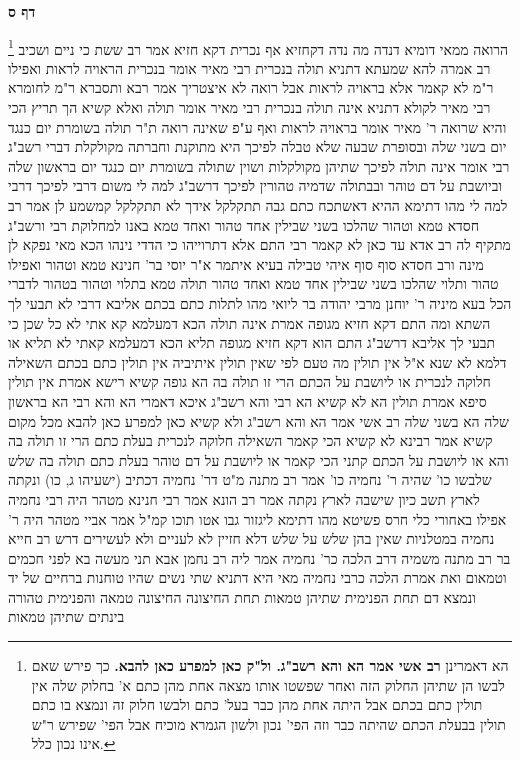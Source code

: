 \documentclass[12pt, openany]{book}
\newcommand{\sethebfont}{
\fontsize{10.5pt}{21.0pt} \selectfont
}
\newcommand{\twocol}[1]{
	{\sethebfont \begin{multicols}{2}
			#1
	\end{multicols}}	
}
\newcommand{\sectname}{}
\newcommand{\newsection}[1]{
	\addcontentsline{toc}{section}{#1}
	\renewcommand{\sectname}{#1}	
	\vspace{-\baselineskip}
	\begin{center}
		\textbf{%
\fontsize{16pt}{16pt}\selectfont
			#1}
	\end{center}
	\vspace{-\baselineskip}
	\nopagebreak
}
\newcommand{\footnotecomment}[1]{
	\renewcommand\thefootnote{}
	\footnote{#1}}
\newcommand{\commenta}[1]{\footnotecomment{#1}}
\begin{document}
\newsection{דף ס}
\twocol{
\commenta{ הא דאמרינן \textbf{רב אשי אמר הא והא רשב"ג. ול"ק כאן למפרע כאן להבא.} כך פירש שאם לבשו הן שתיהן החלוק הזה ואחר שפשטו אותו מצאה אחת מהן כתם א' בחלוק שלה אין תולין כתם בכתם אבל היתה אחת מהן כבר בעל' כתם ולבשו חלוק זה ונמצא בו כתם תולין בבעלת הכתם שהיתה כבר וזה הפי' נכון ולשון הגמרא מוכיח אבל הפי' שפירש ר"ש אינו נכון כלל. }
הרואה 
ממאי דומיא דנדה מה נדה דקחזיא אף נכרית דקא חזיא 
אמר רב ששת כי ניים ושכיב רב אמרה להא שמעתא דתניא תולה בנכרית רבי מאיר אומר בנכרית הראויה לראות ואפילו ר"מ לא קאמר אלא בראויה לראות אבל רואה לא איצטריך 
אמר רבא ותסברא ר"מ לחומרא רבי מאיר לקולא 
דתניא אינה תולה בנכרית רבי מאיר אומר תולה ואלא קשיא הך תריץ הכי והיא שרואה ר' מאיר אומר בראויה לראות ואף ע"פ שאינה רואה 
ת"ר תולה בשומרת יום כנגד יום בשני שלה
ובסופרת שבעה שלא טבלה לפיכך היא מתוקנת וחברתה מקולקלת דברי רשב"ג רבי אומר אינה תולה לפיכך שתיהן מקולקלות 
ושוין שתולה בשומרת יום כנגד יום בראשון שלה
וביושבת על דם טוהר ובבתולה שדמיה טהורין 
לפיכך דרשב"ג למה לי משום דרבי 
לפיכך דרבי למה לי מהו דתימא ההיא דאשתכח כתם גבה תתקלקל אידך לא תתקלקל קמשמע לן 
אמר רב חסדא טמא וטהור שהלכו בשני שבילין אחד טהור ואחד טמא באנו למחלוקת רבי ורשב"ג 
מתקיף לה רב אדא עד כאן לא קאמר רבי התם אלא דתרוייהו כי הדדי נינהו הכא מאי נפקא לן מינה 
ורב חסדא סוף סוף איהי טבילה בעיא 
איתמר א"ר יוסי בר' חנינא טמא וטהור ואפילו טהור ותלוי שהלכו בשני שבילין אחד טמא ואחד טהור תולה טמא בתלוי וטהור בטהור לדברי הכל 
בעא מיניה ר' יוחנן מרבי יהודה בר ליואי מהו לתלות כתם בכתם אליבא דרבי לא תבעי לך
השתא ומה התם דקא חזיא מגופה אמרת אינה תולה הכא דמעלמא קא אתי לא כל שכן 
כי תבעי לך אליבא דרשב"ג התם הוא דקא חזיא מגופה תליא הכא דמעלמא קאתי לא תליא או דלמא לא שנא 
א"ל אין תולין מה טעם לפי שאין תולין 
איתיביה אין תולין כתם בכתם השאילה חלוקה לנכרית או ליושבת על הכתם הרי זו תולה בה 
הא גופה קשיא רישא אמרת אין תולין סיפא אמרת תולין הא לא קשיא הא רבי והא רשב"ג 
איכא דאמרי הא והא רבי הא בראשון שלה הא בשני שלה 
רב אשי אמר הא והא רשב"ג ולא קשיא
כאן למפרע כאן להבא 
מכל מקום קשיא אמר רבינא לא קשיא הכי קאמר השאילה חלוקה לנכרית בעלת כתם הרי זו תולה בה
והא או ליושבת על הכתם קתני הכי קאמר או ליושבת על דם טוהר בעלת כתם תולה בה
שלש שלבשו כו' שהיה ר' נחמיה כו' אמר רב מתנה מ"ט דר' נחמיה דכתיב (ישעיהו ג, כו) ונקתה לארץ תשב כיון שישבה לארץ נקתה 
אמר רב הונא אמר רבי חנינא מטהר היה רבי נחמיה אפילו באחורי כלי חרס פשיטא 
מהו דתימא ליגזור גבו אטו תוכו קמ"ל 
אמר אביי מטהר היה ר' נחמיה במטלניות שאין בהן שלש על שלש דלא חזיין לא לעניים ולא לעשירים 
דרש רב חייא בר רב מתנה משמיה דרב הלכה כר' נחמיה אמר ליה רב נחמן אבא תני מעשה בא לפני חכמים וטמאום ואת אמרת הלכה כרבי נחמיה 
מאי היא דתניא שתי נשים שהיו טוחנות ברחיים של יד ונמצא דם תחת הפנימית שתיהן טמאות תחת החיצונה החיצונה טמאה והפנימית טהורה בינתים שתיהן טמאות 
}
\end{document}
